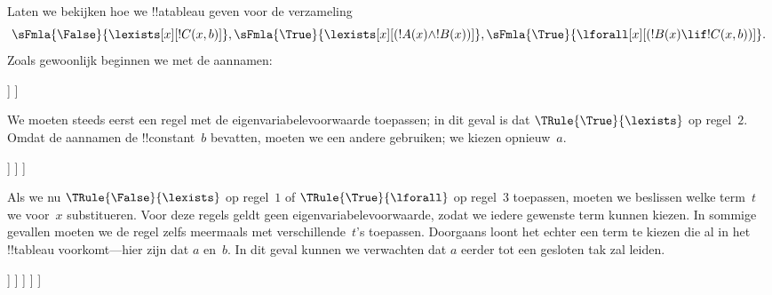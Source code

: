 \documentclass[openany]{memoir}
\begin{document}
\begin{ex}
Laten we bekijken hoe we !!a{tableau} geven voor de verzameling
\[
\sFmla{\False}{\lexists[x][!C(x,b)]},
\sFmla{\True}{\lexists[x][(!A(x) \land !B(x))]},
\sFmla{\True}{\lforall[x][(!B(x) \lif !C(x,b))]}.
\]
Zoals gewoonlijk beginnen we met de aannamen:
\begin{oltableau}
  [\sFmla{\False}{\lexists[x][\formula{C}(x,b)]}, just=\TAss
    [\sFmla{\True}{\lexists[x][(\formula{A}(x) \land \formula{B}(x))]},
      just=\TAss
      [\sFmla{\True}{\lforall[x][(\formula{B}(x) \lif \formula{C}(x,b))]},
        just=\TAss]
    ]
  ]
\end{oltableau}
We moeten steeds eerst een regel met de eigenvariabelevoorwaarde
toepassen; in dit geval is dat $\TRule{\True}{\lexists}$ op regel~$2$.
Omdat de aannamen de !!{constant}~$b$ bevatten, moeten we een andere
gebruiken; we kiezen opnieuw~$a$.
\begin{oltableau}
  [\sFmla{\False}{\lexists[x][\formula{C}(x,b)]}, just=\TAss
    [\sFmla{\True}{\lexists[x][(\formula{A}(x) \land \formula{B}(x))]},
      just=\TAss, checked
      [\sFmla{\True}{\lforall[x][(\formula{B}(x) \lif \formula{C}(x,b))]},
        just=\TAss
        [\sFmla{\True}{\formula{A}(a) \land \formula{B}(a)},
          just={\TRule{\True}{\lexists}[2]}]
      ]
    ]
  ]
\end{oltableau}
Als we nu $\TRule{\False}{\lexists}$ op regel~$1$ of
$\TRule{\True}{\lforall}$ op regel~$3$ toepassen, moeten we beslissen
welke term~$t$ we voor~$x$ substitueren. Voor deze regels geldt geen
eigenvariabelevoorwaarde, zodat we iedere gewenste term kunnen kiezen.
In sommige gevallen moeten we de regel zelfs meermaals met
verschillende~$t$'s toepassen. Doorgaans loont het echter een term te
kiezen die al in het !!{tableau} voorkomt---hier zijn dat $a$ en~$b$.
In dit geval kunnen we verwachten dat $a$ eerder tot een gesloten tak
zal leiden.
\begin{oltableau}
  [\sFmla{\False}{\lexists[x][\formula{C}(x,b)]}, just=\TAss
    [\sFmla{\True}{\lexists[x][(\formula{A}(x) \land \formula{B}(x))]},
      just=\TAss, checked
      [\sFmla{\True}{\lforall[x][(\formula{B}(x) \lif \formula{C}(x,b))]}, just=\TAss
        [\sFmla{\True}{\formula{A}(a) \land \formula{B}(a)}, just={\TRule{\True}{\lexists}[2]}
          [\sFmla{\False}{\formula{C}(a,b)}, just={\TRule{\False}{\lexists}[1]}
            [\sFmla{\True}{\formula{B}(a) \lif \formula{C}(a,b)},
              just={\TRule{\True}{\lforall}[3]}
            ]
          ]
        ]
      ]
    ]
  ]
\end{oltableau}

\end{ex}
\end{document}
